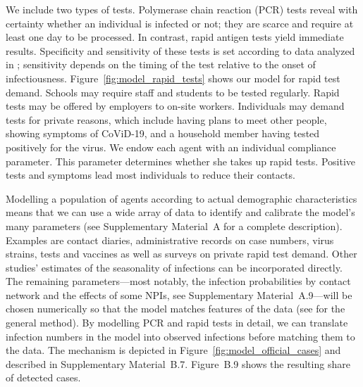 \documentclass[12pt]{article}
\begin{document}
We include two types of tests. Polymerase chain reaction (PCR) tests reveal with
certainty whether an individual is infected or not; they are scarce and require at least
one day to be processed. In contrast, rapid antigen tests yield immediate results.
Specificity and sensitivity of these tests is set according to data analyzed in
\cite{Bruemmer2021, Smith2021}; sensitivity depends on the timing of the test relative
to the onset of infectiousness. Figure~\ref{fig:model_rapid_tests} shows our model for
rapid test demand. Schools may require staff and students to be tested regularly. Rapid
tests may be offered by employers to on-site workers. Individuals may demand tests for
private reasons, which include having plans to meet other people, showing symptoms of
CoViD-19, and a household member having tested positively for the virus. We endow each
agent with an individual compliance parameter. This parameter determines whether she
takes up rapid tests. Positive tests and symptoms lead most individuals to reduce their
contacts.

Modelling a population of agents according to actual demographic characteristics means
that we can use a wide array of data to identify and calibrate the model's many
parameters (see Supplementary Material~A for a complete description). Examples are
contact diaries, administrative records on case numbers, virus strains, tests and
vaccines as well as surveys on private rapid test demand. Other studies' estimates of
the seasonality of infections can be incorporated directly. The remaining
parameters---most notably, the infection probabilities by contact network and the
effects of some NPIs, see Supplementary Material~A.9---will be chosen numerically so
that the model matches features of the data (see \cite{McFadden1989} for the general
method). By modelling PCR and rapid tests in detail, we can translate infection numbers
in the model into observed infections before matching them to the data. The mechanism is
depicted in Figure~\ref{fig:model_official_cases} and described in Supplementary
Material~B.7. Figure~B.9 shows the resulting share of detected cases.
\end{document}
